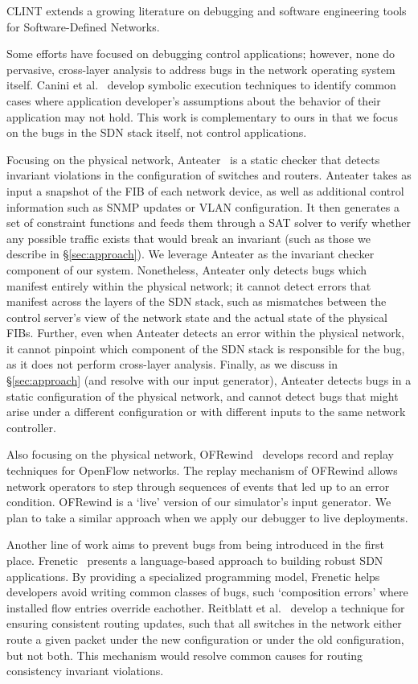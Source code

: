 CLINT extends a growing literature on debugging and software engineering tools for Software-Defined Networks.
    
Some efforts have focused on debugging control applications; however, none do pervasive,
cross-layer analysis to address bugs in the network operating system itself. 
Canini et al.~\cite{canini} develop symbolic execution techniques to identify
common cases where application developer's assumptions about the behavior of
their application may not hold. This work is complementary to ours in
that we focus on the bugs in the SDN stack itself, not control applications.

Focusing on the physical network, Anteater~\cite{anteater} is a static checker that
detects invariant violations in the configuration of switches and routers.
Anteater takes as input a snapshot of the FIB of each network device, as well as
additional control information such as SNMP updates or VLAN configuration. It then
generates a set of constraint functions and feeds them through a SAT solver to verify whether
any possible traffic exists that would break an invariant (such as those we describe in \S\ref{sec:approach}).
 We leverage
Anteater as the invariant checker component of our system.
Nonetheless, Anteater only detects bugs which manifest entirely within the physical network;  
it cannot detect errors that manifest across the layers of the SDN stack, such as mismatches
between the control server's view of the network state and the actual state of the
physical FIBs. Further, even when Anteater detects an error within the physical network, it cannot pinpoint
which component of the SDN stack is responsible for the bug, as it does not perform cross-layer
analysis. Finally, as we discuss in \S\ref{sec:approach} (and resolve with our input generator), 
Anteater detects bugs in a static configuration
of the physical network, and cannot detect bugs that might arise under a different configuration or with different
inputs to the same network controller.

Also focusing on the physical network, OFRewind~\cite{ofrewind} develops record and replay techniques
for OpenFlow networks. The replay
mechanism of OFRewind allows network operators to step through sequences of
events that led up to an error condition. OFRewind is a `live' version of our
simulator's input generator. We plan to take a similar approach when we apply
our debugger to live deployments. 

Another line of work aims to prevent bugs from being introduced in the first
place. Frenetic~\cite{frenetic} presents a language-based approach to building
robust SDN applications. By providing a specialized programming model, Frenetic helps developers avoid writing common classes of
bugs, such `composition errors' where installed flow entries override eachother.
Reitblatt et al.~\cite{consistentupdates} develop a technique for ensuring
consistent routing updates, such that all switches in the network either route
a given packet under the new configuration or under the old configuration,
but not both. This mechanism would resolve common causes for routing consistency 
invariant violations.

